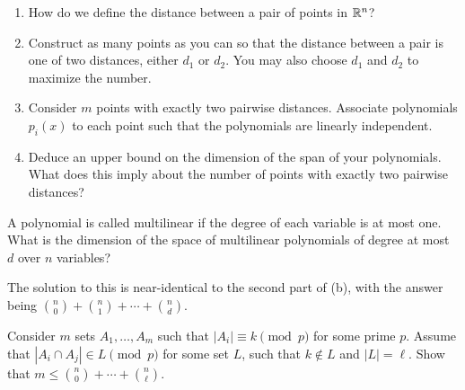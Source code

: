 \documentclass{article}
\begin{document}
	\begin{exercise}
		\phantom{pain}
		\begin{enumerate}[label=(\alph*)]
			\item How do we define the distance between a pair of points in $\mathbb{R}^n$?
			\item Construct as many points as you can so that the distance between a pair is one of two distances, either $d_1$ or $d_2$. You may also choose $d_1$ and $d_2$ to maximize the number.
			\item Consider $m$ points with exactly two pairwise distances. Associate polynomials $p_i(x)$ to each point such that the polynomials are linearly independent.
			\item Deduce an upper bound on the dimension of the span of your polynomials. What does this imply about the number of points with exactly two pairwise distances?
		\end{enumerate}
	\end{exercise}
	\begin{solution*}
		
	\end{solution*}

	\begin{exercise}
		A polynomial is called multilinear if the degree of each variable is at most one. What is the dimension of the space of multilinear polynomials of degree at most $d$ over $n$ variables?
	\end{exercise}
	\begin{solution*}
		The solution to this is near-identical to the second part of (b), with the answer being $\binom{n}{0} + \binom{n}{1} + \cdots + \binom{n}{d}$.
	\end{solution*}

	\begin{exercise}
		Consider $m$ sets $A_1,\ldots,A_m$ such that $|A_i| \equiv k \pmod{p}$ for some prime $p$. Assume that $|A_i \cap A_j| \in L \pmod{p}$ for some set $L$, such that $k \not\in L$ and $|L| = \ell$. Show that $m \le \binom{n}{0} + \cdots + \binom{n}{\ell}$.
	\end{exercise}
	\begin{solution*}
		
	\end{solution*}
\end{document}
